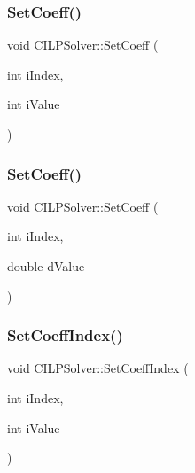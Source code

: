 \mbox{\label{classCILPSolver_a028cb4889ef3dce3535ba3a5db62aaf4}} 
\subsubsection{\texorpdfstring{SetCoeff()}{SetCoeff()}\hspace{0.1cm}{\footnotesize\ttfamily [1/2]}}
{\footnotesize\ttfamily void C\+I\+L\+P\+Solver\+::\+Set\+Coeff (\begin{DoxyParamCaption}\item[{int}]{i\+Index,  }\item[{int}]{i\+Value }\end{DoxyParamCaption})}

\mbox{\label{classCILPSolver_ace812eaf28da94b99150bfd3f76f9e25}} 
\subsubsection{\texorpdfstring{SetCoeff()}{SetCoeff()}\hspace{0.1cm}{\footnotesize\ttfamily [2/2]}}
{\footnotesize\ttfamily void C\+I\+L\+P\+Solver\+::\+Set\+Coeff (\begin{DoxyParamCaption}\item[{int}]{i\+Index,  }\item[{double}]{d\+Value }\end{DoxyParamCaption})}

\mbox{\label{classCILPSolver_a546c06e42c5a767dd6d0c7ff03232f32}} 
\subsubsection{\texorpdfstring{SetCoeffIndex()}{SetCoeffIndex()}}
{\footnotesize\ttfamily void C\+I\+L\+P\+Solver\+::\+Set\+Coeff\+Index (\begin{DoxyParamCaption}\item[{int}]{i\+Index,  }\item[{int}]{i\+Value }\end{DoxyParamCaption})}

